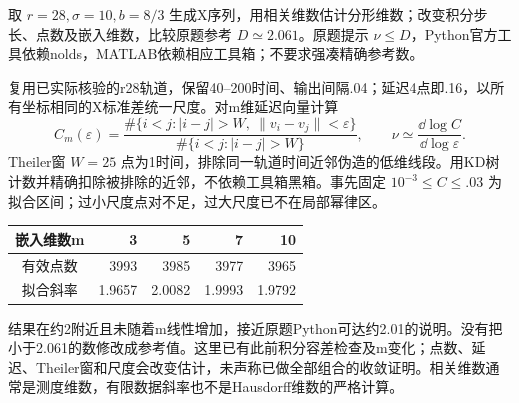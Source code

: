 \begin{exercise}\label{task:chaos-PS9-3}
取 $r=28,\sigma=10,b=8/3$ 生成X序列，用相关维数估计分形维数；改变积分步长、点数及嵌入维数，比较原题参考 $D\simeq2.061$。原题提示 $\nu\le D$，Python官方工具依赖nolds，MATLAB依赖相应工具箱；不要求强凑精确参考数。
\end{exercise}
\begin{solution}
复用已实际核验的r28轨道，保留40--200时间、输出间隔.04；延迟4点即.16，以所有坐标相同的X标准差统一尺度。对m维延迟向量计算
\[
 C_m(\varepsilon)=\frac{\#\{i<j:|i-j|>W,\ \|v_i-v_j\|<\varepsilon\}}
 {\#\{i<j:|i-j|>W\}},\qquad \nu\simeq\frac{\dd\log C}{\dd\log\varepsilon}.
\]
Theiler窗 $W=25$ 点为1时间，排除同一轨道时间近邻伪造的低维线段。用KD树计数并精确扣除被排除的近邻，不依赖工具箱黑箱。事先固定 $10^{-3}\le C\le.03$ 为拟合区间；过小尺度点对不足，过大尺度已不在局部幂律区。
\begin{center}\end{center}
\begin{center}\begin{tabular}{c|rrrr}嵌入维数m&3&5&7&10\\\hline
有效点数&3993&3985&3977&3965\\拟合斜率&1.9657&2.0082&1.9993&1.9792
\end{tabular}\end{center}
结果在约2附近且未随着m线性增加，接近原题Python可达约2.01的说明。没有把小于2.061的数修改成参考值。这里已有此前积分容差检查及m变化；点数、延迟、Theiler窗和尺度会改变估计，未声称已做全部组合的收敛证明。相关维数通常是测度维数，有限数据斜率也不是Hausdorff维数的严格计算。
\end{solution}

